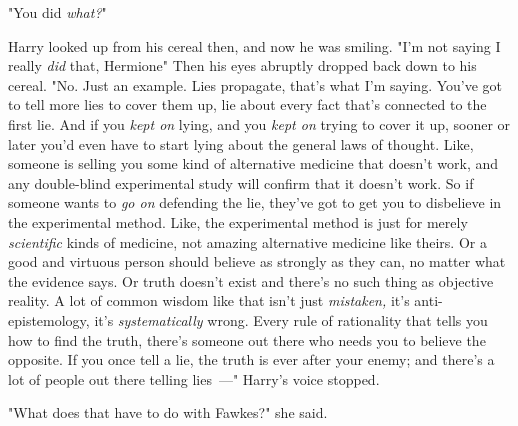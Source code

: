 "You did \emph{what?}"

Harry looked up from his cereal then, and now he was smiling. "I'm not saying I
really \emph{did} that, Hermione{\el}" Then his eyes abruptly dropped back
down to his cereal. "No. Just an example. Lies propagate, that's what I'm
saying. You've got to tell more lies to cover them up, lie about every fact
that's connected to the first lie. And if you \emph{kept on} lying, and you
\emph{kept on} trying to cover it up, sooner or later you'd even have to start
lying about the general laws of thought. Like, someone is selling you some kind
of alternative medicine that doesn't work, and any double-blind experimental
study will confirm that it doesn't work. So if someone wants to \emph{go on}
defending the lie, they've got to get you to disbelieve in the experimental
method. Like, the experimental method is just for merely \emph{scientific}
kinds of medicine, not amazing alternative medicine like theirs. Or a good and
virtuous person should believe as strongly as they can, no matter what the
evidence says. Or truth doesn't exist and there's no such thing as objective
reality. A lot of common wisdom like that isn't just \emph{mistaken,} it's
anti-epistemology, it's \emph{systematically} wrong. Every rule of rationality
that tells you how to find the truth, there's someone out there who needs you
to believe the opposite. If you once tell a lie, the truth is ever after your
enemy; and there's a lot of people out there telling lies~---" Harry's voice
stopped.

"What does that have to do with Fawkes?" she said.

